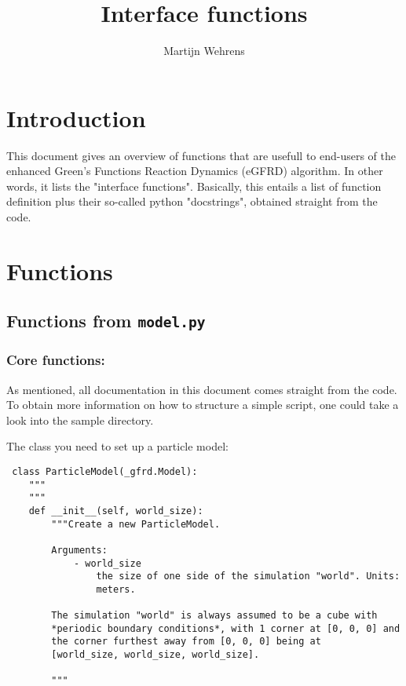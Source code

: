 \documentclass[a4paper,10pt]{article}
\title{Interface functions}
\author{Martijn Wehrens}
\begin{document}
\maketitle

\tableofcontents

\section{Introduction}
This document gives an overview of functions that are usefull to end-users of the enhanced Green's Functions Reaction Dynamics (eGFRD) algorithm. In other words, it lists the "interface functions".
Basically, this entails a list of function definition plus their so-called python "docstrings", obtained straight from the code.

\section{Functions}

\subsection{Functions from \texttt{model.py}}

\subsubsection{Core functions:}
As mentioned, all documentation in this document comes straight from the code. To obtain more information on how to structure a simple script, one could take a look into the sample directory.


The class you need to set up a particle model:
\begin{verbatim}
 class ParticleModel(_gfrd.Model):
    """
    """
    def __init__(self, world_size):
        """Create a new ParticleModel.

        Arguments:
            - world_size
                the size of one side of the simulation "world". Units: 
                meters.

        The simulation "world" is always assumed to be a cube with 
        *periodic boundary conditions*, with 1 corner at [0, 0, 0] and 
        the corner furthest away from [0, 0, 0] being at
        [world_size, world_size, world_size].

        """
\end{verbatim}
\end{document}
